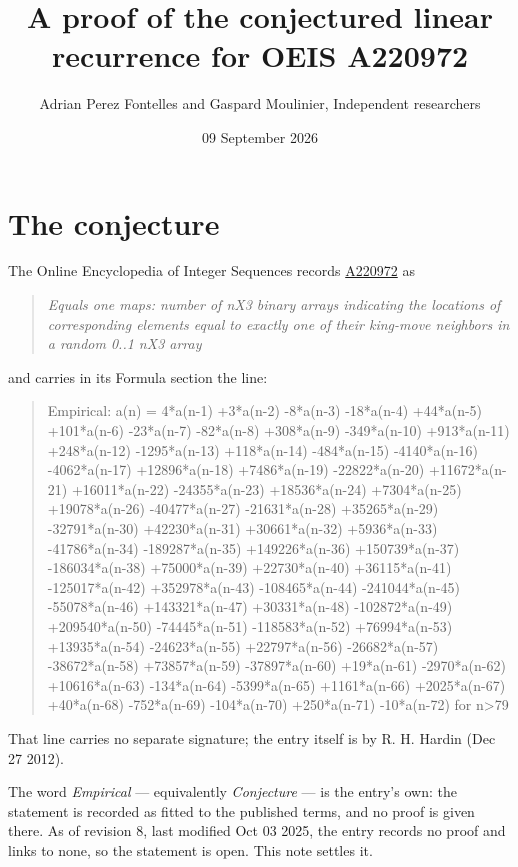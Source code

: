 \documentclass[11pt]{article}
\title{A proof of the conjectured linear recurrence for OEIS A220972}
\author{Adrian Perez Fontelles and Gaspard Moulinier, Independent researchers}
\date{09 September 2026}
\theoremstyle{definition}
\begin{document}
\maketitle
\section{The conjecture}

The Online Encyclopedia of Integer Sequences records \href{https://oeis.org/A220972}{A220972} as

\begin{quote}\itshape Equals one maps: number of nX3 binary arrays indicating the locations of corresponding elements equal to exactly one of their king-move neighbors in a random 0..1 nX3 array\end{quote}

and carries in its Formula section the line:

\begin{quote}\ttfamily Empirical: a(n) = 4*a(n-1) +3*a(n-2) -8*a(n-3) -18*a(n-4) +44*a(n-5) +101*a(n-6) -23*a(n-7) -82*a(n-8) +308*a(n-9) -349*a(n-10) +913*a(n-11) +248*a(n-12) -1295*a(n-13) +118*a(n-14) -484*a(n-15) -4140*a(n-16) -4062*a(n-17) +12896*a(n-18) +7486*a(n-19) -22822*a(n-20) +11672*a(n-21) +16011*a(n-22) -24355*a(n-23) +18536*a(n-24) +7304*a(n-25) +19078*a(n-26) -40477*a(n-27) -21631*a(n-28) +35265*a(n-29) -32791*a(n-30) +42230*a(n-31) +30661*a(n-32) +5936*a(n-33) -41786*a(n-34) -189287*a(n-35) +149226*a(n-36) +150739*a(n-37) -186034*a(n-38) +75000*a(n-39) +22730*a(n-40) +36115*a(n-41) -125017*a(n-42) +352978*a(n-43) -108465*a(n-44) -241044*a(n-45) -55078*a(n-46) +143321*a(n-47) +30331*a(n-48) -102872*a(n-49) +209540*a(n-50) -74445*a(n-51) -118583*a(n-52) +76994*a(n-53) +13935*a(n-54) -24623*a(n-55) +22797*a(n-56) -26682*a(n-57) -38672*a(n-58) +73857*a(n-59) -37897*a(n-60) +19*a(n-61) -2970*a(n-62) +10616*a(n-63) -134*a(n-64) -5399*a(n-65) +1161*a(n-66) +2025*a(n-67) +40*a(n-68) -752*a(n-69) -104*a(n-70) +250*a(n-71) -10*a(n-72) for n>79\end{quote}

That line carries no separate signature; the entry itself is by R. H. Hardin (Dec 27 2012).

The word {\itshape Empirical} --- equivalently {\itshape Conjecture} --- is the entry's own: the statement is recorded as fitted to the published terms, and no proof is given there. As of revision 8, last modified Oct 03 2025, the entry records no proof and links to none, so the statement is open. This note settles it.
\end{document}
